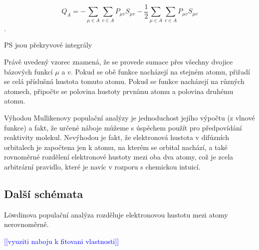\documentclass[
  color, %
  table, %
  lof,   %
  lot,   %
]{fithesis3}
\newcommand\todo[1]{\textcolor{blue}{[[#1]]}}
\begin{document}
\[Q_A = - \sum_{\mu \in A} \sum_{v \in A} P_{\mu v} S_{\mu v} - \frac{1}{2} \sum_{\mu \in A} \sum_{v \in A} P_{\mu v} S_{\mu v}\].

PS jsou překryvové integrály

Právě uvedený vzorec znamená, že se provede sumace přes všechny dvojice bázových funkcí $\mu$ a $v$. Pokud se obě funkce nacházejí na stejném atomu, přiřadí se celá příslušná hustota tomuto atomu. Pokud se funkce nacházejí na různých atomech, připočte se polovina hustoty prvnímu atomu a polovina druhému atomu.

Výhodou Mullikenovy populační analýzy je jednoduchost jejího výpočtu (z vlnové funkce) a fakt, že určené náboje můžeme s úspěchem použít pro předpovídání reaktivity molekul. Nevýhodou je fakt, že elektronová hustota v difúzních orbitalech je započtena jen k atomu, na kterém se orbital nachází, a také rovnoměrné rozdělení elektronové hustoty mezi oba dva atomy, což je zcela arbitrární pravidlo, které je navíc v rozporu s chemickou intuicí. 

\subsection{Další schémata}

Löwdinova populační analýza rozděluje elektronovou hustotu mezi atomy nerovnoměrně.







\todo{vyuziti naboju k fitovani vlastnosti}
\end{document}
